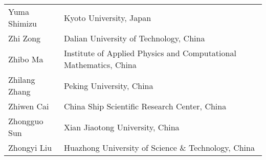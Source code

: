 \begin{longtable}{ll}
Yuma Shimizu&	Kyoto University, Japan\\ 
Zhi Zong&	Dalian University of Technology, China\\ 
Zhibo Ma&	Institute of Applied Physics and Computational Mathematics, China\\ 
Zhilang Zhang&	Peking University, China\\ 
Zhiwen Cai&	China Ship Scientific Research Center, China\\ 
Zhongguo Sun&	Xian Jiaotong University, China\\ 
Zhongyi Liu&	Huazhong University of Science \& Technology, China\\ 
\end{longtable}



